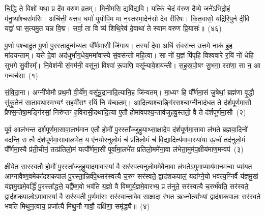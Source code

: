 चि॒द्धि ते॒ विशो॑ यथा॒ प्र दे॑व वरुण व्र॒तम्। मि॒नी॒मसि॒ द्यवि॑द्यवि। यत्किं चे॒दं व॑रुण॒ दैव्ये॒ जने॑\-ऽभिद्रो॒हं म॑नु॒ष्या᳚श्चरा॑मसि। अचि॑त्ती॒ यत्तव॒ धर्मा॑ युयोपि॒म मा न॒स्तस्मा॒देन॑सो देव रीरिषः। कि॒त॒वासो॒ यद्रि॑रि॒पुर्न दी॒वि यद्वा॑ घा स॒त्यमु॒त यन्न वि॒द्म। सर्वा॒ ता वि ष्य॑ शिथि॒रेव॑ दे॒वाथा॑ ते स्याम वरुण प्रि॒यासः॑॥~(४६)

{\anuvakamend[{सोमो॒ गोषु॒ मा र॒यिं मन्त्रो॒ यच्छि॑थि॒रा स॒प्त च॑}]}%

{}

\setcounter{anuvakam}{0}
पू॒र्णा प॒श्चादु॒त पू॒र्णा पु॒रस्ता॒दुन्म॑ध्य॒तः पौ᳚र्णमा॒सी जि॑गाय। तस्यां᳚ दे॒वा अधि॑ सं॒वस॑न्त उत्त॒मे नाक॑ इ॒ह मा॑दयन्ताम्। यत्ते॑ दे॒वा अद॑धुर्भाग॒धेय॒ममा॑वास्ये सं॒वस॑न्तो महि॒त्वा। सा नो॑ य॒ज्ञं पि॑पृहि विश्ववारे र॒यिं नो॑ धेहि सुभगे सु॒वीरम्᳚। नि॒वेश॑नी सं॒गम॑नी॒ वसू॑नां॒ विश्वा॑ रू॒पाणि॒ वसू᳚न्यावे॒शय॑न्ती। स॒ह॒स्र॒पो॒षꣳ सु॒भगा॒ ररा॑णा॒ सा न॒ आ ग॒न्वर्च॑सा~(१)

सं॒वि॒दा॒ना। अग्नी॑षोमौ प्रथ॒मौ वी॒र्ये॑ण॒ वसू᳚न्रु॒द्राना॑दि॒त्यानि॒ह जि॑न्वतम्। मा॒ध्यꣳ हि पौ᳚र्णमा॒सं जु॒षेथां॒ ब्रह्म॑णा वृ॒द्धौ सु॑कृ॒तेन॑ सा॒तावथा॒स्मभ्यꣳ॑ स॒हवी॑राꣳ र॒यिं नि य॑च्छतम्। आ॒दि॒त्याश्चाङ्गि॑रसश्चा॒ग्नीनाद॑धत॒ ते द॑र्\mbox{}शपूर्णमा॒सौ प्रैफ्स॒न्तेषा॒मङ्गि॑रसां॒ निरु॑प्तꣳ ह॒विरासी॒दथा॑दि॒त्या ए॒तौ होमा॑वपश्य॒न्ताव॑जुहवु॒स्ततो॒ वै ते द॑र्\mbox{}शपूर्णमा॒सौ~(२)

पूर्व॒ आल॑भन्त दर्\mbox{}श\-पूर्ण\-मा॒सावा॒लभ॑मान ए॒तौ होमौ॑ पु॒रस्ता᳚ज्जुहुयाथ्सा॒क्षादे॒व द॑र्\mbox{}शपूर्णमा॒सावा ल॑भते ब्रह्मवा॒दिनो॑ वदन्ति॒ स त्वै द॑र्\mbox{}शपूर्णमा॒सावा\-ल॑भेत॒ य ए॑नयोरनुलो॒मं च॑ प्रतिलो॒मं च॑ वि॒द्यादित्य॑मावा॒स्या॑या ऊ॒र्ध्वं तद॑नुलो॒मं पौ᳚र्णमा॒स्यै प्र॑ती॒चीनं॒ तत्प्र॑तिलो॒मं यत्पौ᳚र्णमा॒सीं पूर्वा॑मा॒लभे॑त प्रतिलो॒ममे॑ना॒वा ल॑भेता॒मुम॑प॒क्षीय॑माण॒मन्वप॑~(३)

क्षी॒ये॒त॒ सा॒र॒स्व॒तौ होमौ॑ पु॒रस्ता᳚ज्जुहुयादमावा॒स्या॑ वै सर॑स्वत्यनुलो॒ममे॒वैना॒वा ल॑भते॒\-ऽमुमा॒प्याय॑मान॒मन्वा प्या॑यत आग्नावैष्ण॒वमेका॑\-दश\-कपालं पु॒रस्ता॒न्निर्व॑पे॒थ्सर॑स्वत्यै च॒रुꣳ सर॑स्वते॒ द्वाद॑श\-कपालं॒ यदा᳚ग्ने॒यो भव॑त्य॒ग्निर्वै य॑ज्ञमु॒खं य॑ज्ञमु॒खमे॒वर्द्धिं॑ पु॒रस्ता᳚द्धत्ते॒ यद्वै᳚ष्ण॒वो भव॑ति य॒ज्ञो वै विष्णु॑र्य॒ज्ञमे॒वारभ्य॒ प्र त॑नुते॒ सर॑स्वत्यै च॒रुर्भ॑वति॒ सर॑स्वते॒ द्वाद॑श\-कपालो\-ऽमावा॒स्या॑ वै सर॑स्वती पू॒र्णमा॑सः॒ सर॑स्वा॒न्तावे॒व सा॒क्षादा र॑भत ऋ॒ध्नोत्या᳚भ्यां॒ द्वाद॑श\-कपालः॒ सर॑स्वते भवति मिथुन॒त्वाय॒ प्रजा᳚त्यै मिथु॒नौ गावौ॒ दक्षि॑णा॒ समृ॑द्ध्यै॥~(४)

